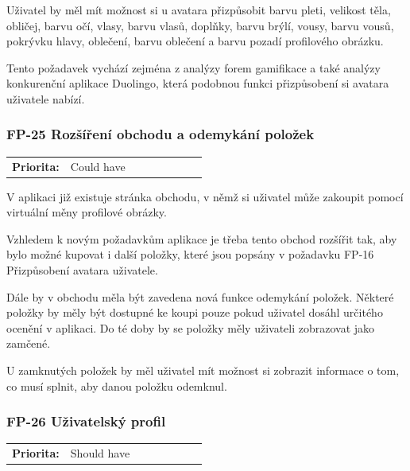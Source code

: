 
Uživatel by měl mít možnost si u avatara přizpůsobit barvu pleti, velikost těla, obličej, barvu očí, vlasy, barvu vlasů, doplňky, barvu brýlí, vousy, barvu vousů, pokrývku hlavy, oblečení, barvu oblečení a barvu pozadí profilového obrázku.

Tento požadavek vychází zejména z analýzy forem gamifikace a také analýzy konkurenční aplikace Duolingo, která podobnou funkci přizpůsobení si avatara uživatele nabízí.

\subsubsection{FP-25 Rozšíření obchodu a odemykání položek}

\begin{tabular}{lp{0.7\linewidth}}
    \textbf{Priorita:} & Could have \\
\end{tabular}

V aplikaci již existuje stránka obchodu, v němž si uživatel může zakoupit pomocí virtuální měny profilové obrázky.

Vzhledem k novým požadavkům aplikace je třeba tento obchod rozšířit tak, aby bylo možné kupovat i další položky, které jsou popsány v požadavku FP-16 Přizpůsobení avatara uživatele. %

Dále by v obchodu měla být zavedena nová funkce odemykání položek. Některé položky by měly být dostupné ke koupi pouze pokud uživatel dosáhl určitého ocenění v aplikaci. Do té doby by se položky měly uživateli zobrazovat jako zamčené.

U zamknutých položek by měl uživatel mít možnost si zobrazit informace o tom, co musí splnit, aby danou položku odemknul.

\subsubsection{FP-26 Uživatelský profil}

\begin{tabular}{lp{0.7\linewidth}}
    \textbf{Priorita:} & Should have \\
\end{tabular}

